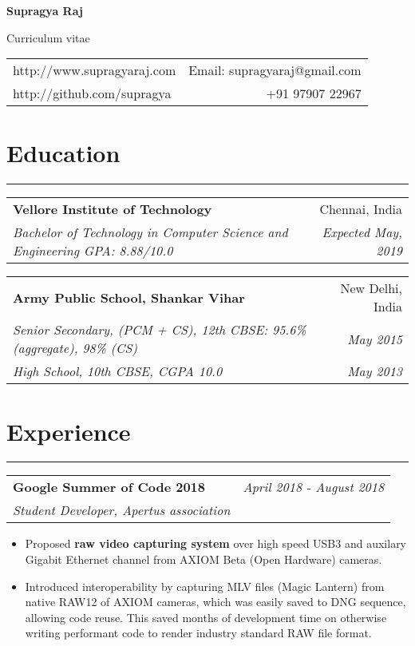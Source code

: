 \documentclass[11pt, a4paper]{article}
\begin{document}
\begin{center}
\Large \textbf{Supragya Raj}


\normalsize Curriculum vitae


\end{center}
\begin{tabularx}{\textwidth}{X r}
	http://www.supragyaraj.com & Email: supragyaraj@gmail.com \\
	http://github.com/supragya & +91 97907 22967 
\end{tabularx}
\newline


\section*{Education}
\vspace{-8px}
\hrule
\vspace{8px}
\hspace{5px}
\begin{tabularx}{\textwidth}{X r}
	\textbf{Vellore Institute of Technology} & Chennai, India \\
	\textit{\small Bachelor of Technology in Computer Science and Engineering GPA: 8.88/10.0} & \textit{Expected May, 2019} 
\end{tabularx}

\vspace{8px}
\hspace{5px}
\begin{tabularx}{\textwidth}{X r}
	\textbf{Army Public School, Shankar Vihar} & New Delhi, India \\
	\textit{\small Senior Secondary, (PCM + CS), 12th CBSE:  95.6\% (aggregate), 98\% (CS)} & \textit{May 2015} \\
	\textit{\small High School, 10th CBSE, CGPA 10.0} & \textit{May 2013}
\end{tabularx}


\section*{Experience}
\vspace{-8px}
\hrule
\vspace{8px}
\hspace{5px}
\begin{tabularx}{\textwidth}{X r}
	\textbf{Google Summer of Code 2018} & \textit{April 2018 - August 2018} \\
	\textit{\small Student Developer, Apertus association} & \\
\end{tabularx}

\begin{itemize}
	\itemsep0em
	\item Proposed \textbf{raw video capturing system} over high speed USB3 and auxilary Gigabit Ethernet channel from AXIOM Beta (Open Hardware) cameras.
	\item Introduced interoperability by capturing MLV files (Magic Lantern) from native RAW12 of AXIOM cameras, which was easily saved to DNG sequence, allowing code reuse. This saved months of development time on otherwise writing performant code to render industry standard RAW file format.
	
\end{itemize}
\end{document}
